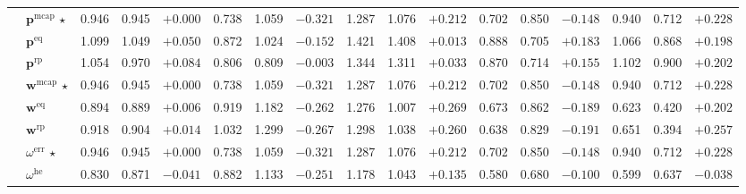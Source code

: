 \documentclass{article}
\begin{document}
\begin{table}[ht]
{\begin{tabular}{ll ccc ccc ccc ccc ccc}
  & $\mathbf{p}^{\mathrm{mcap}}$ $\star$ & 0.946 & 0.945 & $+0.000$              & 0.738 & 1.059 & $-0.321$ & 1.287 & 1.076 & $+0.212$ & 0.702 & 0.850 & $-0.148$ & 0.940 & 0.712 & $+0.228$ \\
  & $\mathbf{p}^{\mathrm{eq}}$          & 1.099 & 1.049 & $+0.050$ & 0.872 & 1.024 & $-0.152$ & 1.421 & 1.408 & $+0.013$ & 0.888 & 0.705 & $+0.183$ & 1.066 & 0.868 & $+0.198$ \\
  & $\mathbf{p}^{\mathrm{rp}}$          & 1.054 & 0.970 & $+0.084$ & 0.806 & 0.809 & $-0.003$ & 1.344 & 1.311 & $+0.033$ & 0.870 & 0.714 & $+0.155$ & 1.102 & 0.900 & $+0.202$ \\
\midrule
{}
  & $\mathbf{w}^{\mathrm{mcap}}$ $\star$ & 0.946 & 0.945 & $+0.000$            & 0.738 & 1.059 & $-0.321$ & 1.287 & 1.076 & $+0.212$ & 0.702 & 0.850 & $-0.148$ & 0.940 & 0.712 & $+0.228$ \\
  & $\mathbf{w}^{\mathrm{eq}}$           & 0.894 & 0.889 & $+0.006$ & 0.919 & 1.182 & $-0.262$ & 1.276 & 1.007 & $+0.269$ & 0.673 & 0.862 & $-0.189$ & 0.623 & 0.420 & $+0.202$ \\
  & $\mathbf{w}^{\mathrm{rp}}$           & 0.918 & 0.904 & $+0.014$ & 1.032 & 1.299 & $-0.267$ & 1.298 & 1.038 & $+0.260$ & 0.638 & 0.829 & $-0.191$ & 0.651 & 0.394 & $+0.257$ \\
\midrule
{}
  & $\omega^{\mathrm{err}}$ $\star$ & 0.946 & 0.945 & $+0.000$             & 0.738 & 1.059 & $-0.321$ & 1.287 & 1.076 & $+0.212$ & 0.702 & 0.850 & $-0.148$ & 0.940 & 0.712 & $+0.228$ \\
  & $\omega^{\mathrm{he}}$          & 0.830 & 0.871 & $-0.041$  & 0.882 & 1.133 & $-0.251$ & 1.178 & 1.043 & $+0.135$ & 0.580 & 0.680 & $-0.100$ & 0.599 & 0.637 & $-0.038$ \\
\bottomrule
\end{tabular}%
}
\end{table}
\end{document}

